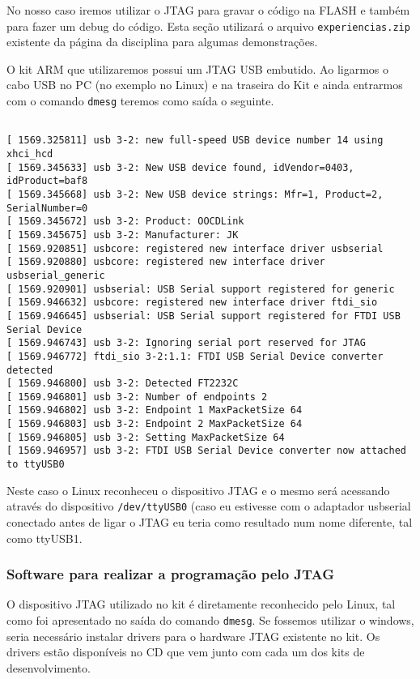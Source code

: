 \documentclass[a4paper,10pt]{article}
\begin{document}
No nosso caso iremos utilizar o JTAG para gravar o código na FLASH e também para fazer um debug do código. Esta seção utilizará o arquivo \texttt{experiencias.zip} existente da página da disciplina para algumas demonstrações.


O kit ARM que utilizaremos possui um JTAG USB embutido. Ao ligarmos o cabo USB no PC (no exemplo no Linux) e na traseira do Kit e ainda entrarmos com o comando \verb|dmesg| teremos como saída o seguinte.

\begin{lstlisting}

[ 1569.325811] usb 3-2: new full-speed USB device number 14 using xhci_hcd
[ 1569.345633] usb 3-2: New USB device found, idVendor=0403, idProduct=baf8
[ 1569.345668] usb 3-2: New USB device strings: Mfr=1, Product=2, SerialNumber=0
[ 1569.345672] usb 3-2: Product: OOCDLink
[ 1569.345675] usb 3-2: Manufacturer: JK
[ 1569.920851] usbcore: registered new interface driver usbserial
[ 1569.920880] usbcore: registered new interface driver usbserial_generic
[ 1569.920901] usbserial: USB Serial support registered for generic
[ 1569.946632] usbcore: registered new interface driver ftdi_sio
[ 1569.946645] usbserial: USB Serial support registered for FTDI USB Serial Device
[ 1569.946743] usb 3-2: Ignoring serial port reserved for JTAG
[ 1569.946772] ftdi_sio 3-2:1.1: FTDI USB Serial Device converter detected
[ 1569.946800] usb 3-2: Detected FT2232C
[ 1569.946801] usb 3-2: Number of endpoints 2
[ 1569.946802] usb 3-2: Endpoint 1 MaxPacketSize 64
[ 1569.946803] usb 3-2: Endpoint 2 MaxPacketSize 64
[ 1569.946805] usb 3-2: Setting MaxPacketSize 64
[ 1569.946957] usb 3-2: FTDI USB Serial Device converter now attached to ttyUSB0
\end{lstlisting}

Neste caso o Linux reconheceu o dispositivo JTAG e o mesmo será acessando através do dispositivo \verb|/dev/ttyUSB0| (caso eu estivesse com o adaptador usbserial conectado antes de ligar o JTAG eu teria como resultado num nome diferente, tal como ttyUSB1.

\subsubsection{Software para realizar a programação pelo JTAG}

O dispositivo JTAG utilizado no kit é diretamente reconhecido pelo Linux, tal como foi apresentado no saída do comando \verb|dmesg|. Se fossemos utilizar o windows, seria necessário instalar drivers para o hardware JTAG existente no kit. Os drivers estão disponíveis no CD que vem junto com cada um dos kits de desenvolvimento.
\end{document}
